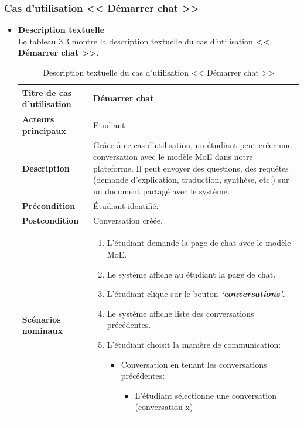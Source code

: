 \subsubsection{ Cas d’utilisation << Démarrer chat >>}
\begin{itemize}[itemsep=1pt, parsep=1pt]
    \item \textbf{Description textuelle}\\
    Le tableau 3.3 montre la description textuelle du cas d’utilisation \textbf{<< Démarrer chat >>}.
    \begin{longtable}{|>{\RaggedRight\arraybackslash}p{4cm}|>{\RaggedRight\arraybackslash}p{12cm}|}
        \caption{Description textuelle du cas d’utilisation << Démarrer chat >>} \\
        \hline
        \textbf{Titre de cas d’utilisation} & \textbf{Démarrer chat} \\
        \hline
        \textbf{Acteurs principaux} & Etudiant \\
        \hline
        \textbf{Description} & Grâce à ce cas d’utilisation, un étudiant peut créer une conversation avec le modèle MoE dans notre plateforme. Il peut envoyer des questions, des requêtes (demande d’explication, traduction, synthèse, etc.) sur un document partagé avec le système. \\
        \hline
        \textbf{Précondition} & Étudiant identifié. \\
        \hline
        \textbf{Postcondition} & Conversation créée. \\
        \hline
        \textbf{Scénarios nominaux} &    
        \begin{enumerate}
            \item L’étudiant demande la page de chat avec le modèle MoE.
            \item Le système affiche au étudiant la page de chat.
            \item L’étudiant clique sur le bouton \textbf{\textit{‘conversations’}}.
            \item Le système affiche liste des conversations précédentes. 
            \item L’étudiant choisit la manière de communication:
            \begin{itemize}[label=--]
                \item Conversation en tenant les conversations précédentes:
                \begin{itemize}[label=5.1.]
                    \item L’étudiant sélectionne une conversation (conversation x)

\end{itemize}
\end{itemize}
\end{enumerate}
\end{longtable}
\end{itemize}
